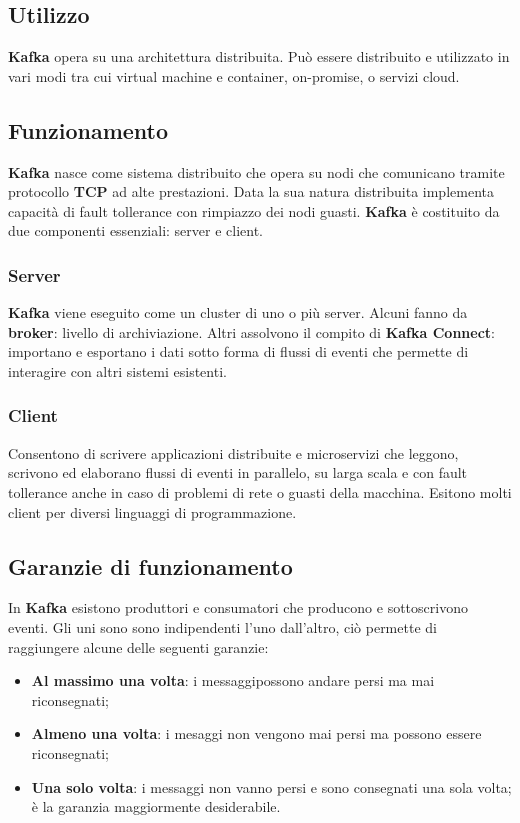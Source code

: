 \documentclass{article}
\begin{document}
\subsection{Utilizzo}
\textbf{Kafka} opera su una architettura distribuita. Può essere distribuito e utilizzato in vari modi tra cui virtual machine e container, on-promise, o servizi cloud.

\subsection{Funzionamento}
\textbf{Kafka} nasce come sistema distribuito che opera su nodi che comunicano tramite protocollo \textbf{TCP} ad alte prestazioni. Data la sua natura distribuita implementa capacità di fault tollerance con rimpiazzo dei nodi guasti. 
\textbf{Kafka} è costituito da due componenti essenziali: server e client.
\subsubsection{Server}
\textbf{Kafka} viene eseguito come un cluster di uno o più server. Alcuni fanno da \textbf{broker}: livello di archiviazione. Altri assolvono il compito di \textbf{\textbf{Kafka} Connect}: importano e esportano i dati sotto forma di  flussi di eventi che permette di interagire con altri sistemi esistenti.
\subsubsection{Client}
Consentono di scrivere applicazioni distribuite e microservizi che leggono, scrivono ed elaborano flussi di eventi in parallelo, su larga scala e con fault tollerance anche in caso di problemi di rete o guasti della macchina.
Esitono molti client per diversi linguaggi di programmazione.
\subsection{Garanzie di funzionamento}
In \textbf{Kafka} esistono produttori e consumatori che producono e sottoscrivono eventi. 
Gli uni sono sono indipendenti l'uno dall'altro, ciò permette di raggiungere alcune delle seguenti garanzie:
\begin{itemize}
    \item \textbf{Al massimo una volta}: i messaggipossono andare persi ma mai riconsegnati;
    \item \textbf{Almeno una volta}: i mesaggi non 		vengono mai persi ma possono essere 		riconsegnati;
    \item \textbf{Una solo volta}: i messaggi non  		vanno persi e sono consegnati una 		sola volta; è la garanzia maggiormente desiderabile.
\end{itemize}
\end{document}
